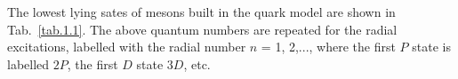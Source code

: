 The lowest lying sates of mesons built in the quark model are shown in Tab.~\ref{tab.1.1}.
The above quantum numbers are repeated for the radial excitations, labelled with the radial number $n$ = 1, 2,..., where the first $P$ state is labelled $2P$, the first $D$ state $3D$, etc.

